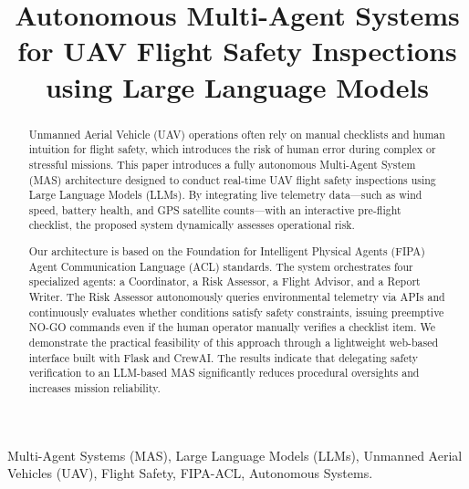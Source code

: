 \documentclass[conference]{IEEEtran}
\begin{document}
\title{Autonomous Multi-Agent Systems for UAV Flight Safety Inspections using Large Language Models}

\author{
}

\maketitle

\begin{abstract}
Unmanned Aerial Vehicle (UAV) operations often rely on manual checklists and human intuition for flight safety, which introduces the risk of human error during complex or stressful missions. This paper introduces a fully autonomous Multi-Agent System (MAS) architecture designed to conduct real-time UAV flight safety inspections using Large Language Models (LLMs). By integrating live telemetry data—such as wind speed, battery health, and GPS satellite counts—with an interactive pre-flight checklist, the proposed system dynamically assesses operational risk.

Our architecture is based on the Foundation for Intelligent Physical Agents (FIPA) Agent Communication Language (ACL) standards. The system orchestrates four specialized agents: a Coordinator, a Risk Assessor, a Flight Advisor, and a Report Writer. The Risk Assessor autonomously queries environmental telemetry via APIs and continuously evaluates whether conditions satisfy safety constraints, issuing preemptive NO-GO commands even if the human operator manually verifies a checklist item. We demonstrate the practical feasibility of this approach through a lightweight web-based interface built with Flask and CrewAI. The results indicate that delegating safety verification to an LLM-based MAS significantly reduces procedural oversights and increases mission reliability.
\end{abstract}

\begin{IEEEkeywords}
Multi-Agent Systems (MAS), Large Language Models (LLMs), Unmanned Aerial Vehicles (UAV), Flight Safety, FIPA-ACL, Autonomous Systems.
\end{IEEEkeywords}
\end{document}
